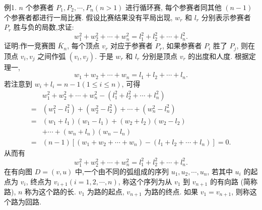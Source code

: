 例1. $n$ 个参赛者 $P_1, P_2, \cdots, P_n(n>1)$ 进行循环赛, 每个参赛者同其他 $(n-1)$ 个参赛者都进行一局比赛.
假设比赛结果没有平局出现, $w_r$ 和 $l_r$ 分别表示参赛者 $P_r$ 胜与负的局数,求证:
$$
w_1^2+w_2^2+\cdots+w_n^2=l_1^2+l_2^2+\cdots+l_n^2 .
$$
证明:作一竞赛图 $\bar{K}_n$, 每个顶点 $v_r$ 对应于参赛者 $P_r$, 如果参赛者 $P_i$ 胜了 $P_j$, 则在顶点 $v_i, v_j$ 之间作弧 $\left(v_i, v_j\right)$. 于是 $w_r$ 和 $l_r$ 分别是顶点 $v_r$ 的出度和人度.
根据定理一,
$$
w_1+w_2+\cdots+w_n=l_1+l_2+\cdots+l_n .
$$
若注意到 $w_i+l_i=n-1(1 \leqslant i \leqslant n)$, 可得
$$
\begin{aligned}
& w_1^2+w_2^2+\cdots+w_n^2-\left(l_1^2+l_2^2+\cdots+l_n^2\right) \\
= & \left(w_1^2-l_1^2\right)+\left(w_2^2-l_2^2\right)+\cdots+\left(w_n^2-l_n^2\right) \\
= & \left(w_1+l_1\right)\left(w_1-l_1\right)+\left(w_2+l_2\right)\left(w_2-l_2\right) \\
& +\cdots+\left(w_n+l_n\right)\left(w_n-l_n\right) \\
= & (n-1)\left[\left(w_1+w_2+\cdots+w_n\right)-\left(l_1+l_2+\cdots+l_n\right)\right]=0 .
\end{aligned}
$$
从而有
$$
w_1^2+w_2^2+\cdots+w_n^2=l_1^2+l_2^2+\cdots+l_n^2 .
$$
在有向图 $D=(v, u)$ 中,一个由不同的弧组成的序列 $u_1, u_2, \cdots, u_n$, 若其中 $u_i$ 的起点为 $v_i$, 终点为 $v_{i+1}(i=1,2, \cdots, n)$, 称这个序列为从 $v_1$ 到 $v_{n+1}$ 的有向路 (简称路), $n$ 称为这个路的长.
$v_1$ 为路的起点, $v_{n+1}$ 为路的终点.
如果 $v_1=v_{n+1}$, 则称这个路为回路.



